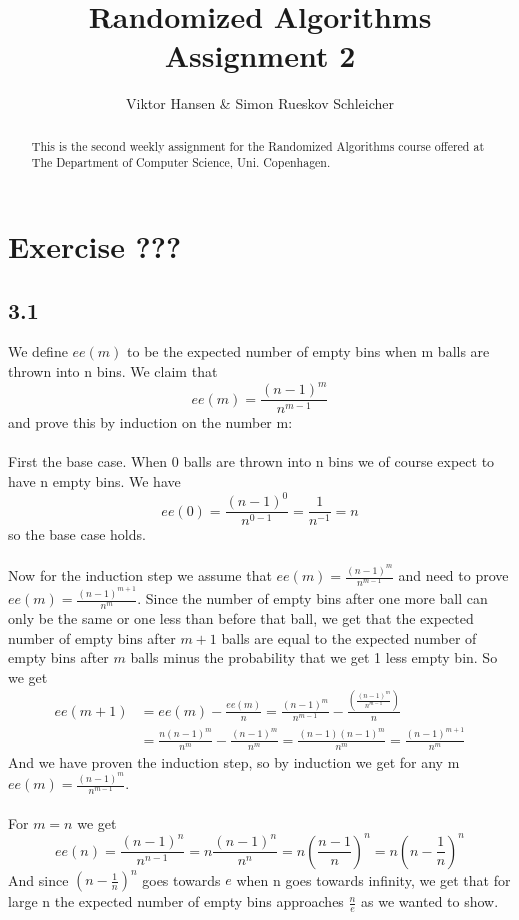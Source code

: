 \documentclass[12pt]{article}
\begin{document}
\nocite{*}


\title{Randomized Algorithms \\
       Assignment 2}

\author{Viktor Hansen \& Simon Rueskov Schleicher}

\maketitle

\begin{abstract}
  This is the second weekly assignment for the Randomized Algorithms course offered at The Department of Computer Science, Uni. Copenhagen.
\end{abstract}

\pagebreak

\section*{Exercise ???}

\subsection*{3.1}
We define $ee(m)$ to be the expected number of empty bins when m balls are thrown into n bins. We claim that $$ee(m)=\frac{(n-1)^m}{n^{m-1}}$$ and prove this by induction on the number m:\\
\\
First the base case. When 0 balls are thrown into n bins we of course expect to have n empty bins. We have $$ee(0)=\frac{(n-1)^0}{n^{0-1}}=\frac{1}{n^{-1}}=n$$ so the base case holds.\\
\\
Now for the induction step we assume that $ee(m)=\frac{(n-1)^m}{n^{m-1}}$ and need to prove $ee(m)=\frac{(n-1)^{m+1}}{n^m}$. Since the number of empty bins after one more ball can only be the same or one less than before that ball, we get that the expected number of empty bins after $m+1$ balls are equal to the expected number of empty bins after $m$ balls minus the probability that we get 1 less empty bin. So we get \begin{align*}ee(m+1)&=ee(m)-\frac{ee(m)}{n}=\frac{(n-1)^m}{n^{m-1}}-\frac{\left(\frac{(n-1)^m}{n^{m-1}}\right)}{n}\\&=\frac{n(n-1)^m}{n^m}-\frac{(n-1)^m}{n^m}=\frac{(n-1)(n-1)^m}{n^m}=\frac{(n-1)^{m+1}}{n^m}\end{align*}
And we have proven the induction step, so by induction we get for any m $ee(m)=\frac{(n-1)^m}{n^{m-1}}$.\\
\\
For $m=n$ we get $$ee(n)=\frac{(n-1)^n}{n^{n-1}}=n\frac{(n-1)^n}{n^n}=n\left(\frac{n-1}{n}\right)^n=n\left(n-\frac{1}{n}\right)^n$$ And since $\left(n-\frac{1}{n}\right)^n$ goes towards $e$ when n goes towards infinity, we get that for large n the expected number of empty bins approaches $\frac{n}{e}$ as we wanted to show.
\end{document}
